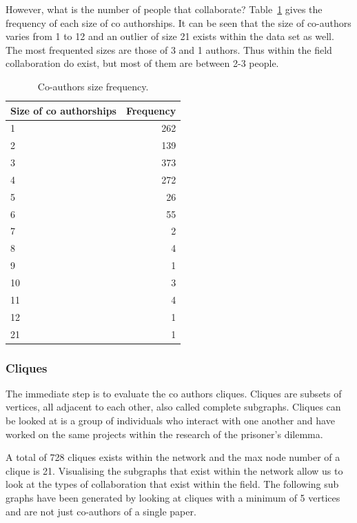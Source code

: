 \documentclass{article}
\begin{document}
However, what is the number of people that collaborate? Table~\ref{table:size_frequency}
gives the frequency of each size of co authorships. It can be seen that the size
of co-authors varies from 1 to 12 and an outlier of size 21 exists within the data
set as well. The most frequented sizes are those of 3 and 1 authors. Thus within
the field collaboration do exist, but most of them are between 2-3 people.

\begin{table}
    \begin{center}
    \begin{tabular}{lr}
        \toprule
        Size of co authorships &  Frequency \\
        \midrule
        1 & 262 \\
        2 & 139 \\
        3 & 373 \\
        4 & 272 \\
        5 & 26 \\
        6 & 55 \\
        7 & 2 \\
        8 & 4 \\
        9 & 1 \\
        10 & 3 \\
        11 & 4 \\
        12 & 1 \\
        21 & 1 \\
        \bottomrule
    \end{tabular}
    \caption{Co-authors size frequency.}\label{table:size_frequency}
    \end{center}
\end{table}

\subsubsection{Cliques}

The immediate step is to evaluate the co authors cliques. Cliques are 
subsets of vertices, all adjacent to each other, also called complete subgraphs.
Cliques can be looked at is a group of individuals who interact with one another
and have worked on the same projects within the research of the prisoner's dilemma.

A total of 728 cliques exists within the network and the max node number of a
clique is 21. Visualising the subgraphs that exist within the network allow us
to look at the types of collaboration that exist within the field. The following
sub graphs have been generated by looking at cliques with a minimum of 5 vertices
and are not just co-authors of a single paper. 
\end{document}
